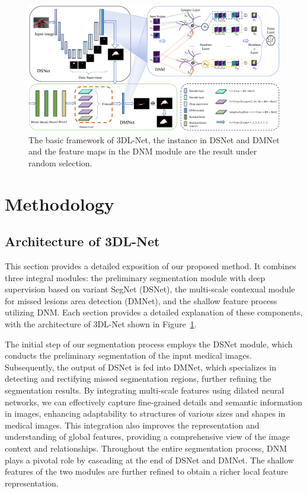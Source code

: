 \documentclass[review]{elsarticle}
\begin{document}
	\begin{figure}[t]
		\centering
		\begin{adjustwidth}{-3.5cm}{}
			\includegraphics[scale=0.8]{3DL_architecture.pdf}
		\end{adjustwidth}
		\caption{The basic framework of 3DL-Net, the instance in DSNet and DMNet and the feature maps in the DNM module are the result under random selection.}
		\label{fig:3DL}
	\end{figure}

	\section{Methodology}
	\label{section:methodology}
	\subsection{Architecture of 3DL-Net} 
	This section provides a detailed exposition of our proposed method. It combines three integral modules: the preliminary segmentation module with deep supervision based on variant SegNet (DSNet), the multi-scale contexual module for missed lesions area detection (DMNet), and the shallow feature process utilizing DNM. Each section provides a detailed explanation of these components, with the architecture of 3DL-Net shown in Figure~\ref{fig:3DL}.
	
	The initial step of our segmentation process employs the DSNet module, which conducts the preliminary segmentation of the input medical images. Subsequently, the output of DSNet is fed into DMNet, which specializes in detecting and rectifying missed segmentation regions, further refining the segmentation results. By integrating multi-scale features using dilated neural networks, we can effectively capture fine-grained details and semantic information in images, enhancing adaptability to structures of various sizes and shapes in medical images. This integration also improves the representation and understanding of global features, providing a comprehensive view of the image context and relationships. Throughout the entire segmentation process, DNM plays a pivotal role by cascading at the end of DSNet and DMNet. The shallow features of the two modules are further refined to obtain a richer local feature representation.
\end{document}
